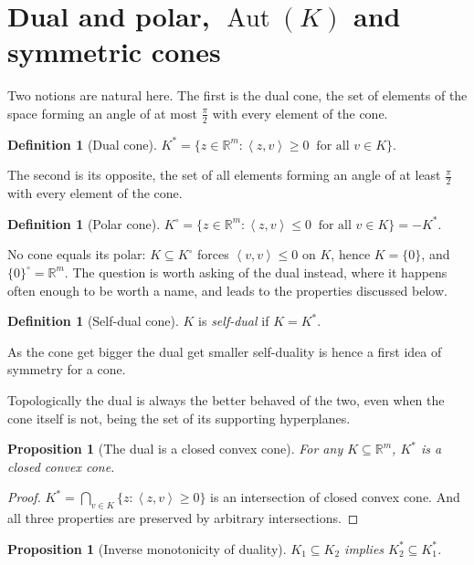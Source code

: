 \documentclass[a4paper,11pt]{book}
\theoremstyle{plain}
\newtheorem{proposition}[theorem]{Proposition}
\theoremstyle{definition}
\newtheorem{definition}[theorem]{Definition}
\theoremstyle{remark}
\numberwithin{equation}{chapter}
\numberwithin{algorithm}{chapter}
\newcommand{\R}{\mathbb{R}}
\newcommand{\inner}[2]{\left\langle #1, #2 \right\rangle}
\newcommand{\Aut}{\operatorname{Aut}}
\begin{document}
	\section{Dual and polar, $\Aut(K)$ and symmetric cones}
	
	Two notions are natural here. The first is the dual cone, the set of elements
	of the space forming an angle of at most $\frac{\pi}{2}$ with every element of
	the cone.
	
	\begin{definition}[Dual cone]
		$K^*=\{z\in\R^m:\inner{z}{v}\geq0\ \text{ for all }v\in K\}$.
	\end{definition}
	\label{key}
	The second is its opposite, the set of all elements forming an angle of at
	least $\frac{\pi}{2}$ with every element of the cone.
	
	\begin{definition}[Polar cone]
		$K^\circ=\{z\in\R^m:\inner{z}{v}\leq0\ \text{ for all }v\in K\}=-K^*$.
	\end{definition}
	
	No cone equals its polar: $K\subseteq K^\circ$ forces $\inner{v}{v}\leq0$ on
	$K$, hence $K=\{0\}$, and $\{0\}^\circ=\R^m$. The question is worth asking of
	the dual instead, where it happens often enough to be worth a name, and leads
	to the properties discussed below.
	\begin{definition}[Self-dual cone]
		$K$ is \emph{self-dual} if $K=K^*$.
	\end{definition}
	
	As the cone get bigger the dual get smaller self-duality is hence a first idea of symmetry for a cone.
	
	Topologically the dual is always the better behaved of the two, even when the
	cone itself is not, being the set of its supporting hyperplanes.
	\begin{proposition}[The dual is a closed convex cone]
		For any $K\subseteq\R^m$, $K^*$ is a closed convex cone.
	\end{proposition}
	
	\begin{proof}
		$K^*=\bigcap_{v\in K}\{z:\inner{z}{v}\geq0\}$ is an intersection of closed
		convex cone. And
		all three properties are preserved by arbitrary intersections.
	\end{proof}
	
	\begin{proposition}[Inverse monotonicity of duality]
		$K_1\subseteq K_2$ implies $K_2^*\subseteq K_1^*$.
	\end{proposition}
	
\end{document}
